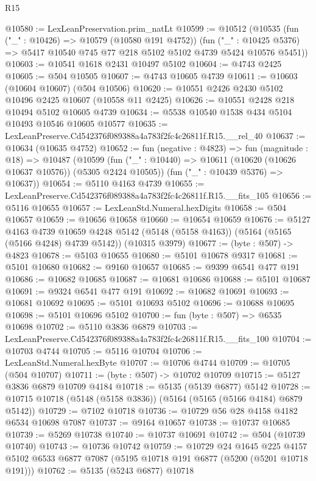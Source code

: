 \begin{lexlean}{R15}
\begin{coremodule}
{{{{{{{{{{{@10580 := LexLeanPreservation.prim_natLt
@10599 := @10512
    (@10535
      (fun ("_" : @10426) => @10579 (@10580 @191 @4752))
      (fun ("_" : @10425 @5376) => @5417 @10540 @745 @77 @218 @5102 @5102 @4739 @5424 @10576 @5451))
@10603 := @10541 @1618 @2431 @10497 @5102
@10604 := @4743 @2425
@10605 := @504 @10505
@10607 := @4743 @10605 @4739
@10611 := @10603 (@10604 @10607) (@504 @10506)
@10620 := @10551 @2426 @2430 @5102 @10496 @2425 @10607 (@10558 @11 @2425)
@10626 := @10551 @2428 @218 @10494 @5102 @10605 @4739
@10634 := @5538 @10540 @1538 @434 @5104 @10493 @10546 @10605 @10577
@10635 := LexLeanPreserve.Cd542376f089388a4a783f2fc4c26811f.R15.__rel_40
@10637 := @10634 (@10635 @4752)
@10652 := fun (negative : @4823) =>
  fun (magnitude : @18) =>
  @10487
    (@10599
      (fun ("_" : @10440) => @10611 (@10620 (@10626 @10637 @10576)) (@5305 @2424 @10505))
      (fun ("_" : @10439 @5376) => @10637))
@10654 := @5110 @4163 @4739
@10655 := LexLeanPreserve.Cd542376f089388a4a783f2fc4c26811f.R15.__fits_105
@10656 := @5116 @10655
@10657 := LexLeanStd.Numeral.hexDigits
@10658 := @504 @10657
@10659 := @10656 @10658
@10660 := @10654 @10659
@10676 := @5127
    @4163
    @4739
    @10659
    @4248
    @5142
    (@5148 (@5158 @4163))
    (@5164 (@5165 (@5166 @4248) @4739 @5142))
    (@10315 @3979)
@10677 := (byte : @507) -> @4823
@10678 := @5103 @10655
@10680 := @5101 @10678 @9317
@10681 := @5101 @10680
@10682 := @9160 @10657
@10685 := @9399 @6541 @477 @191
@10686 := @10682 @10685
@10687 := @10681 @10686
@10688 := @5101 @10687
@10691 := @9324 @6541 @477 @191
@10692 := @10682 @10691
@10693 := @10681 @10692
@10695 := @5101 @10693 @5102
@10696 := @10688 @10695
@10698 := @5101 @10696 @5102
@10700 := fun (byte : @507) => @6535 @10698
@10702 := @5110 @3836 @6879
@10703 := LexLeanPreserve.Cd542376f089388a4a783f2fc4c26811f.R15.__fits_100
@10704 := @10703 @4744
@10705 := @5116 @10704
@10706 := LexLeanStd.Numeral.hexByte
@10707 := @10706 @4744
@10709 := @10705 (@504 @10707)
@10711 := (byte : @507) -> @10702 @10709
@10715 := @5127 @3836 @6879 @10709 @4184
@10718 := @5135 (@5139 @6877) @5142
@10728 := @10715 @10718 (@5148 (@5158 @3836)) (@5164 (@5165 (@5166 @4184) @6879 @5142))
@10729 := @7102 @10718
@10736 := @10729 @56 @28 @4158 @4182 @6534 @10698 @7087
@10737 := @9164 @10657
@10738 := @10737 @10685
@10739 := @5269 @10738
@10740 := @10737 @10691
@10742 := @504 (@10739 @10740)
@10743 := @10736 @10742
@10759 := @10729
    @24
    @1645
    @225
    @4157
    @5102
    @6533
    @6877
    @7087
    (@5195 @10718 @191 @6877 (@5200 (@5201 @10718 @191)))
@10762 := @5135 (@5243 @6877) @10718
}}}}}}}}}}}
\end{coremodule}
\end{lexlean}
